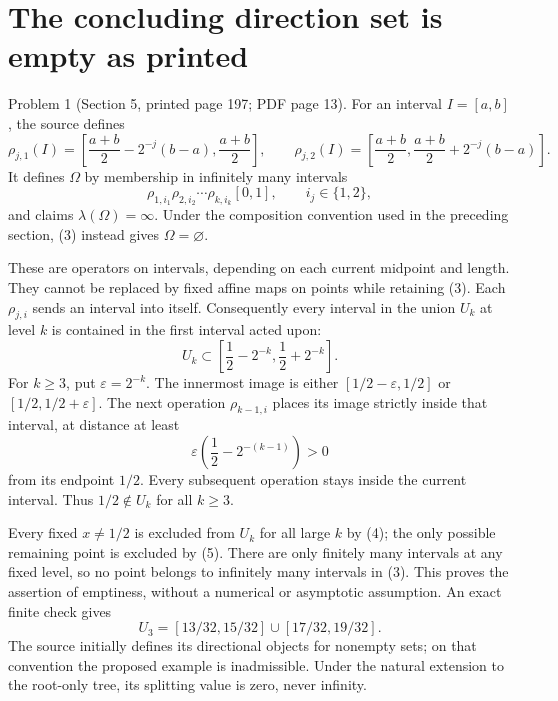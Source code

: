 \documentclass[10pt]{article}
\begin{document}
\section*{The concluding direction set is empty as printed}
Problem 1 (Section 5, printed page 197; PDF page 13).  For an interval \(I=[a,b]\), the source defines \[\rho_{j,1}(I)=
 \left[\frac{a+b}{2}-2^{-j}(b-a),\frac{a+b}{2}\right],
 \qquad
 \rho_{j,2}(I)=
 \left[\frac{a+b}{2},\frac{a+b}{2}+2^{-j}(b-a)\right].
 \tag{2}\] It defines \(\Omega\) by membership in infinitely many intervals \[\rho_{1,i_1}\rho_{2,i_2}\cdots\rho_{k,i_k}[0,1],
 \qquad i_j\in\{1,2\},
 \tag{3}\] and claims \(\lambda(\Omega)=\infty\). Under the composition convention used in the preceding section, (3) instead gives \(\Omega=\varnothing\).\par
These are operators on intervals, depending on each current midpoint and length. They cannot be replaced by fixed affine maps on points while retaining (3). Each \(\rho_{j,i}\) sends an interval into itself. Consequently every interval in the union \(U_k\) at level \(k\) is contained in the first interval acted upon: \[U_k\subset
 \left[\frac12-2^{-k},\frac12+2^{-k}\right].
 \tag{4}\] For \(k\ge3\), put \(\varepsilon=2^{-k}\). The innermost image is either \([1/2-\varepsilon,1/2]\) or \([1/2,1/2+\varepsilon]\). The next operation \(\rho_{k-1,i}\) places its image strictly inside that interval, at distance at least \[\varepsilon\left(\frac12-2^{-(k-1)}\right)>0
 \tag{5}\] from its endpoint \(1/2\). Every subsequent operation stays inside the current interval. Thus \(1/2\notin U_k\) for all \(k\ge3\).\par
Every fixed \(x\ne1/2\) is excluded from \(U_k\) for all large \(k\) by (4); the only possible remaining point is excluded by (5). There are only finitely many intervals at any fixed level, so no point belongs to infinitely many intervals in (3). This proves the assertion of emptiness, without a numerical or asymptotic assumption. An exact finite check gives \[U_3=[13/32,15/32]\cup[17/32,19/32].\] The source initially defines its directional objects for nonempty sets; on that convention the proposed example is inadmissible. Under the natural extension to the root-only tree, its splitting value is zero, never infinity.\par
\end{document}
